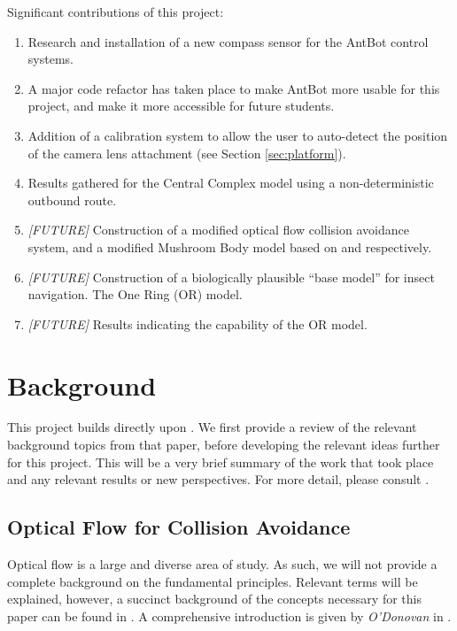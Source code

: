 \documentclass[a4paper,11pt,twoside,openright]{article}
\let\oldsection\section
\def\section{\cleardoublepage\oldsection}
\begin{document}
Significant contributions of this project:
\begin{enumerate}
\item{
  Research and installation of a new compass sensor for the AntBot control
  systems.
}

\item{
  A major code refactor has taken place to make AntBot more usable for this
  project, and make it more accessible for future students.
}

\item{
  Addition of a calibration system to allow the user to auto-detect the position
  of the camera lens attachment (see Section \ref{sec:platform}).
}

\item{
  Results gathered for the Central Complex model using a non-deterministic
  outbound route.
}

\item{
  \textit{[FUTURE]}
  Construction of a modified optical flow collision avoidance system, and a
  modified Mushroom Body model based on \cite{Mitchell2018} and \cite{Zhang2017}
  respectively.
}

\item{
  \textit{[FUTURE]} Construction of a biologically plausible ``base model'' for
  insect navigation. The One Ring (OR) model.
}

\item{
  \textit{[FUTURE]} Results indicating the capability of the OR model.
}
\end{enumerate}
\newpage

\section{ Background }
This project builds directly upon \cite{Mitchell2018}. We first provide a review
of the relevant background topics from that paper, before developing the relevant
ideas further for this project. This will be a very brief summary of the work
that took place and any relevant results or new perspectives. For more detail,
please consult \cite{Mitchell2018}.


\subsection{ Optical Flow for Collision Avoidance } \label{OFBackground}
Optical flow is a large and diverse area of study. As such, we will not provide
a complete background on the fundamental principles. Relevant terms will be
explained, however, a succinct background of the concepts necessary for this
paper can be found in \cite{Mitchell2018}. A comprehensive introduction is
given by \textit{O'Donovan} in \cite{ODonovan2005}.
\newline
\par
\end{document}
